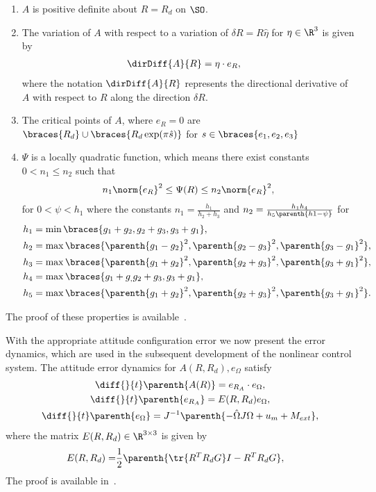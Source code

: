 \documentclass[smallextended]{svjour3}       %
\begin{document}
\begin{enumerate}
    \item \label{item:prop_A_psd} \( A \) is  positive definite about \( R = R_d \) on \( \SO \).
    \item \label{item:prop_eRA} The variation of \( A \) with respect to a variation of \( \delta R = R \hat{\eta} \) for \( \eta \in \R^3 \) is given by
	\begin{align}\label{eq:dirDiff_A}
		\dirDiff{A}{R} &= \eta \cdot e_{R} ,
	\end{align}
	where the notation \( \dirDiff{A}{R} \) represents the directional derivative of $A$ with respect to $R$ along the direction $\delta R$.
\item \label{item:prop_A_critical_points} The critical points of \( A \), where \( e_R = 0 \) are \( \braces{R_d} \cup \braces{R_d \exp(\pi \hat s) } \) for \( s \in \braces{e_1, e_2, e_3}\)
    \item \label{item:prop_A_quadratic} \( \Psi \) is a locally quadratic function, which means there exist constants \( 0 < n_1 \leq n_2 \) such that
    \begin{align}\label{eq:A_bound}
        n_1 \norm{e_R}^2 \leq \Psi(R) \leq n_2 \norm{e_R}^2 ,
    \end{align}
    for $0<\psi < h_1 $ where the constants \( n_1 = \frac{h_1}{h_2 + h_3} \) and \( n_2 = \frac{h_1 h_4}{h_5 \parenth{h1 - \psi} }\) for
	\begin{align*}
		h_1 &= \min\braces{g_1 + g_2, g_2 + g_3 , g_3 + g_1} ,\\
		h_2 &= \max\braces{\parenth{g_1 -g_2}^2,\parenth{g_2 -g_3}^2 , \parenth{g_3 -g_1}^2} ,\\
		h_3 &= \max\braces{\parenth{g_1 + g_2}^2, \parenth{g_2 + g_3}^2 , \parenth{g_3 + g_1}^2}, \\		
        h_4 &= \max\braces{g_1 + g_, g_2 +g_3, g_3 + g_1}, \\
        h_5 &= \max\braces{\parenth{g_1 + g_2}^2, \parenth{g_2 + g_3}^2, \parenth{g_3 + g_1}^2}.
	\end{align*}
\end{enumerate}
The proof of these properties is available~\cite{kulumani2017a}.

With the appropriate attitude configuration error we now present the error dynamics, which are used in the subsequent development of the nonlinear control system.
The attitude error dynamics for \( A(R, R_d), e_\Omega \) satisfy
\begin{gather}
    \diff{}{t} \parenth{A(R)} = e_{R_A} \cdot e_\Omega , \label{eq:A_dot} \\
    \diff{}{t} \parenth{e_{R_A}} = E(R, R_d) e_\Omega , \label{eq:eRA_dot} \\
    \diff{}{t} \parenth{e_\Omega} = J^{-1} \parenth{-\hat{\Omega} J \Omega + u_m + M_{ext}} , \label{eq:eW_dot}
\end{gather}
where the matrix \(E(R,R_d)\in \R^{3\times3} \) is given by
\begin{align}
    E(R,R_d) = &\frac{1}{2} \parenth{\tr{R^T R_d G}I - R^T R_d G} , \label{eq:E}
\end{align}
The proof is available in~\cite{kulumani2017a}.
\end{document}

